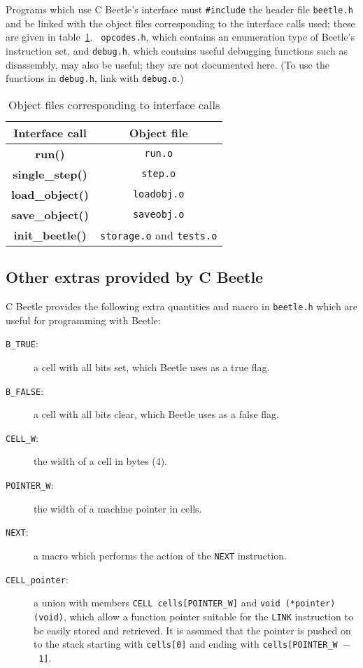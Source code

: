 \documentclass{article}
\begin{document}
Programs which use C Beetle's interface must {\tt \#include} the header file
{\tt beetle.h} and be linked with the object files corresponding to the
interface calls used; these are given in table~\ref{objtable}. {\tt
opcodes.h}, which contains an enumeration type of Beetle's instruction set,
and {\tt debug.h}, which contains useful debugging functions such as
disassembly, may also be useful; they are not documented here. (To use the
functions in {\tt debug.h}, link with {\tt debug.o}.)

\begin{table}
\begin{center}
\begin{tabular}{|c|c|} \hline
\rule[-2mm]{0mm}{6mm}\bf Interface call & \bf Object file \\ \hline
{\bf run()} & {\tt run.o} \\
{\bf single\_step()} & {\tt step.o} \\
{\bf load\_object()} & {\tt loadobj.o} \\
{\bf save\_object()} & {\tt saveobj.o} \\
{\bf init\_beetle()} & {\tt storage.o} and {\tt tests.o} \\  \hline
\end{tabular}
\caption{\label{objtable}Object files corresponding to interface calls}
\end{center}
\end{table}


\subsection{Other extras provided by C Beetle}

C Beetle provides the following extra quantities and macro in {\tt beetle.h}
which are useful for programming with Beetle:

\begin{description}
\item[{\tt B\_TRUE}:] a cell with all bits set, which Beetle uses as a true
flag.
\item[{\tt B\_FALSE}:] a cell with all bits clear, which Beetle uses as a
false flag.
\item[{\tt CELL\_W}:] the width of a cell in bytes (4).
\item[{\tt POINTER\_W}:] the width of a machine pointer in cells.
\item[{\tt NEXT}:] a macro which performs the action of the {\tt NEXT}
instruction.
\item[{\tt CELL\_pointer}:] a union with members {\tt CELL cells[POINTER\_W]} and {\tt void (*pointer)(void)}, which allow a function pointer suitable for the {\tt LINK} instruction to be easily stored and retrieved. It is assumed that the pointer is pushed on to the stack starting with {\tt cells[0]} and ending with {\tt cells[POINTER\_W~$-$~1]}.
\end{description}




\end{document}
